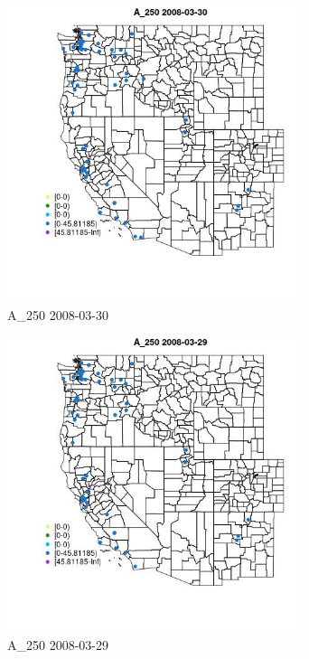 \begin{figure} 
\centering  
\includegraphics[width=0.77\textwidth]{Code_Outputs/Report_ML_input_PM25_Step4_part_e_de_duplicated_aves_MapObsA_2502008-03-30.jpg} 
\caption{\label{fig:Report_ML_input_PM25_Step4_part_e_de_duplicated_avesMapObsA_2502008-03-30}A_250 2008-03-30} 
\end{figure} 
 

\clearpage 

\begin{figure} 
\centering  
\includegraphics[width=0.77\textwidth]{Code_Outputs/Report_ML_input_PM25_Step4_part_e_de_duplicated_aves_MapObsA_2502008-03-29.jpg} 
\caption{\label{fig:Report_ML_input_PM25_Step4_part_e_de_duplicated_avesMapObsA_2502008-03-29}A_250 2008-03-29} 
\end{figure} 
 

